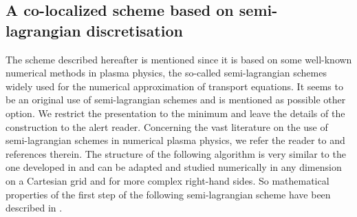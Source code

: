 %
\subsection{A co-localized scheme based on semi-lagrangian discretisation}


The scheme described hereafter is mentioned since it is based on some well-known 
numerical methods in plasma physics, the so-called semi-lagrangian schemes widely used for the numerical approximation of transport equations.
It seems to be an original use of semi-lagrangian schemes 
and is mentioned as possible other option. 
We restrict the presentation to the minimum and leave the details  of the construction to the alert reader.
Concerning the   vast literature on the use of semi-lagrangian schemes
in numerical plasma physics, we refer the reader to \cite{feix,guo,umeda,fifi,soso} and references therein.
	The structure of the following  algorithm is very similar to the one developed in \cite{compfluids} and can be adapted and studied numerically
	in any dimension on a Cartesian grid and for more complex right-hand sides.
	So mathematical properties of the  first step of the following semi-lagrangian scheme have been described in  \cite{cedar}.



